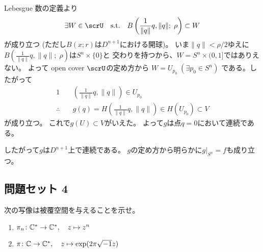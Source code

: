 \documentclass[report]{jlreq}
\begin{document}
\begin{answer}
\begin{innerproof}
        Lebesgue 数の定義より
        \begin{equation}
            \exists W \in \scrU
            \quad \text{s.t.} \quad
            B\left(\frac{1}{\|q\|} q, \|q\|;\; \rho\right) \subset W
        \end{equation}
        が成り立つ (ただし$B(x; r)$は$D^{n + 1}$における開球)。
        いま$\|q\| < \rho / 2$ゆえに
        $B\left(\frac{1}{\|q\|} q, \|q\|;\; \rho\right)$は$S^n \times \{0\}$と
        交わりを持つから、$W = S^n \times (0, 1]$ではありえない。
        よって open cover $\scrU$の定め方から
        $W = U_{p_0}\; (\exists p_0 \in S^n)$
        である。したがって
        \begin{alignat}{1}
            & \left(\frac{1}{\|q\|} q, \|q\|\right) \in U_{p_0} \\
            \therefore \quad &g(q) =
                H \left(\frac{1}{\|q\|} q, \|q\|\right)
                \in H(U_{p_0}) \subset V
        \end{alignat}
        が成り立つ。
        これで$g(U) \subset V$がいえた。
        よって$g$は点$q = 0$において連続である。
    \end{innerproof}
    したがって$g$は$D^{n + 1}$上で連続である。
    $g$の定め方から明らかに$g|_{S^n} = f$も成り立つ。
\end{answer}

\subsection{問題セット 4}

\begin{problem}[幾何学II 4.1]
    次の写像は被覆空間を与えることを示せ。
    \begin{enumerate}
        \item $\pi_n \colon \mathbb{C}^* \to \mathbb{C}^*, \quad z \mapsto z^n$
        \item $\pi \colon \mathbb{C} \to \mathbb{C}^*, \quad z \mapsto \exp(2\pi \sqrt{-1} z)$
    \end{enumerate}
\end{problem}
\end{document}
